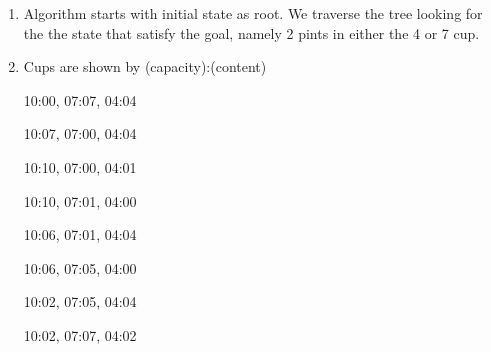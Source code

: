\documentclass[12pt,letterpaper]{article}
\begin{document}
\begin{enumerate}
\begin{enumerate}
        \item %
        Algorithm starts with initial state as root. We traverse the tree looking for the the state that satisfy the goal, namely 2 pints in either the 4 or 7 cup.
        
        \item %
        Cups are shown by (capacity):(content)
        
        10:00, 07:07, 04:04
        
        10:07, 07:00, 04:04
        
        10:10, 07:00, 04:01
        
        10:10, 07:01, 04:00
        
        10:06, 07:01, 04:04
        
        10:06, 07:05, 04:00
        
        10:02, 07:05, 04:04
        
        10:02, 07:07, 04:02
        \end{enumerate}
            
    \end{enumerate}
    
\end{document}
